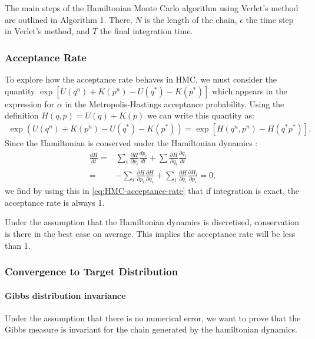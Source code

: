 \documentclass[a4paper, 12pt,oneside]{article}
\begin{document}
			
			The main steps of the Hamiltonian Monte Carlo algorithm using Verlet's method are outlined in Algorithm 1. There, $N$ is the length of the chain, $\epsilon$ the time step in Verlet's method, and $T$ the final integration time.
			\subsubsection{Acceptance Rate}
			To explore how the acceptance rate behaves in HMC, we must consider the quantity \newline $\exp \left[U\left(q^n\right)+K\left(p^n\right)-U\left(q^*\right)-K\left(p^*\right)\right]$ which appears in the expression for $\alpha$ in the Metropolis-Hastings acceptance probability. Using the definition $H(q, p)=U(q)+K(p)$ we can write this quantity as:
			\begin{gather}
				\exp \left(U\left(q^n\right)+K\left(p^n\right)-U\left(q^*\right)-K\left(p^*\right)\right) = \exp \left[H\left(q^n, p^n\right)-H\left(q^* p^*\right)\right].
				\label{eq:HMC-acceptance-rate} 
			\end{gather}
			Since the Hamiltonian is conserved under the Hamiltonian dynamics :
			\begin{align}
			\frac{d H}{d t}=&\sum_i \frac{\partial H}{\partial p_i} \frac{d p_i}{d t}+\sum \frac{\partial H}{\partial q_i} \frac{\partial q_i}{d t} \\
			=&-\sum_i \frac{\partial H}{\partial p_i} \frac{\partial H}{\partial q_i}+\sum_i \frac{\partial H}{\partial q_i} \frac{\partial H_i}{\partial p_i} = 0,
			\end{align}
			we find by using this in \ref{eq:HMC-acceptance-rate} that if integration is exact, the acceptance rate is always 1.

			Under the assumption that the Hamiltonian dynamics is discretised, conservation is there in the best case on average. This implies the acceptance rate will be less than 1. 
			\subsubsection{Convergence to Target Distribution}
			\paragraph{Gibbs distribution invariance}
			Under the assumption that there is no numerical error, we want to prove that the Gibbs measure is invariant for the chain generated by the hamiltonian dynamics.
	
\end{document}
